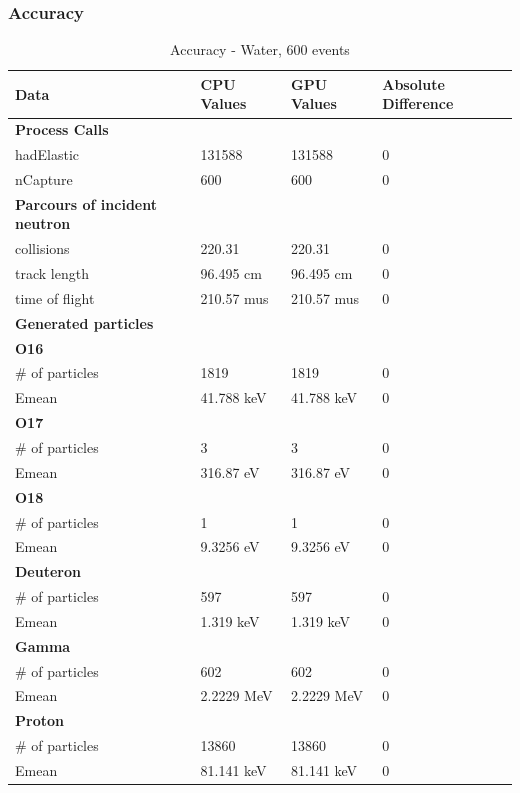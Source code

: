 \documentclass[12pt]{article}
\begin{document}
	\subsubsection{Accuracy}
		\begin{table}[H]
		\centering
		\caption{Accuracy - Water, 600 events}\label{sys3Acc}
		\begin{tabular}{lp{2.3cm}p{2.3cm}l}
		\toprule
		\bf Data & CPU Values & GPU Values &Absolute Difference\\\midrule
		\bf Process Calls&&&\\
		hadElastic&131588&131588&0\\
		nCapture&600&600&0\\
	
		\midrule
		\bf Parcours of incident neutron&&&\\
		collisions&220.31&220.31&0\\
		track length&96.495 cm&96.495 cm&0\\
		time of flight&210.57 mus&210.57 mus&0\\

		\midrule
		\bf Generated particles&&&\\
		\bf{O16}&&&\\
		\# of particles&1819&1819&0\\
		Emean&41.788 keV&41.788 keV&0\\
		
		\bf{O17}&&&\\
		\# of particles&3&3&0\\
		Emean&316.87 eV&316.87 eV&0\\
		
		\bf{O18}&&&\\
		\# of particles&1&1&0\\
		Emean&9.3256 eV&9.3256 eV&0\\	
		\bf{Deuteron}&&&\\
		\# of particles&597&597&0\\
		Emean&1.319 keV&1.319 keV&0\\	
		\bf{Gamma}&&&\\
		\# of particles&602&602&0\\
		Emean&2.2229 MeV&2.2229 MeV&0\\	
		\bf{Proton}&&&\\
		\# of particles&13860&13860&0\\
		Emean&81.141 keV&81.141 keV&0\\\bottomrule
		\end{tabular}
		\end{table}
		\break
\end{document}
